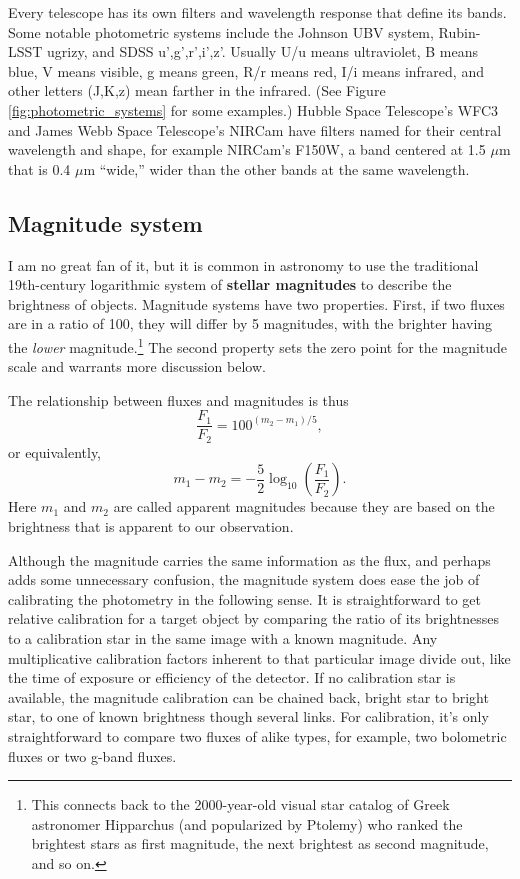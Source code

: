 Every telescope has its own filters and wavelength response that define its bands.  Some notable photometric systems include the Johnson UBV system, Rubin-LSST ugrizy, and SDSS u',g',r',i',z'.  Usually U/u means ultraviolet, B means blue, V means visible, g means green, R/r means red, I/i means infrared, and other letters (J,K,z) mean farther in the infrared.  (See Figure \ref{fig:photometric_systems} for some examples.)  Hubble Space Telescope's WFC3 and James Webb Space Telescope's NIRCam have filters named for their central wavelength and shape, for example NIRCam's F150W, a  band centered at 1.5 $\mu$m that is 0.4 $\mu$m ``wide,'' wider than the other bands at the same wavelength.


\subsection{Magnitude system}
I am no great fan of it, but it is common in astronomy to use the traditional 19th-century logarithmic system of \textbf{stellar magnitudes} to describe the brightness of objects.  Magnitude systems have two properties.  First, if two fluxes are in a ratio of 100, they will differ by 5 magnitudes, with the brighter having the \textit{lower} magnitude.\footnote{This connects back to the 2000-year-old visual star catalog of Greek astronomer Hipparchus (and popularized by Ptolemy) who ranked the brightest stars as first magnitude, the next brightest as second magnitude, and so on.}  The second property sets the zero point for the magnitude scale and warrants more discussion below.

The relationship between fluxes and magnitudes is thus
\begin{equation}
  \frac{F_1}{F_2} = 100^{(m_2-m_1)/5},
\end{equation}
or equivalently,
\begin{equation}
  m_1-m_2 =  -\frac{5}{2} \log_{10} \left( \frac{F_1}{F_2} \right).
\end{equation}
Here $m_1$ and $m_2$ are called apparent magnitudes because they are based on the brightness that is apparent to our observation.

Although the magnitude carries the same information as the flux, and perhaps adds some unnecessary confusion, the magnitude system does ease the job of calibrating the photometry in the following sense.  It is straightforward to get relative calibration for a target object by comparing the ratio of its brightnesses to a calibration star in the same image with a known magnitude.  Any multiplicative calibration factors inherent to that particular image divide out, like the time of exposure or efficiency of the detector.  If no calibration star is available, the magnitude calibration can be chained back, bright star to bright star, to one of known brightness though several links.  For calibration, it's only straightforward to compare two fluxes of alike types, for example, two bolometric fluxes or two g-band fluxes.

